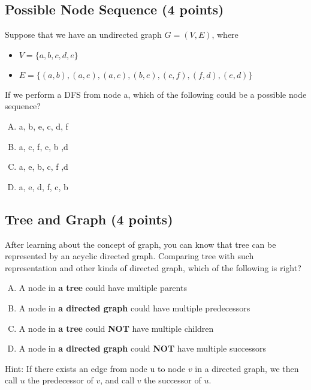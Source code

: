 \documentclass[11pt]{exam}
\begin{document}
\subsection{Possible Node Sequence (4 points)}
    Suppose that we have an undirected graph $G=(V,E)$, where
    \begin{itemize}
        \item $V=\{a,b,c,d,e\}$
        \item $E = \{(a, b), (a, e), (a, c), (b, e), (c, f), (f, d), (e, d)\}$
    \end{itemize}
    If we perform a DFS from node a, which of the following could be a possible node sequence?
    \begin{enumerate}[A.]
        \item a, b, e, c, d, f
        \item a, c, f, e, b ,d
        \item a, e, b, c, f ,d
        \item a, e, d, f, c, b
    \end{enumerate}
    \begin{solution}
    \end{solution}
\subsection{Tree and Graph (4 points)}
    After learning about the concept of graph, you can know that tree can be represented by an acyclic directed graph. Comparing tree with such representation and other kinds of directed graph, which of the following is right?
    \begin{enumerate}[A.]
        \item A node in \textbf{a tree} could have multiple parents
        \item A node in \textbf{a directed graph} could have multiple predecessors
        \item A node in \textbf{a tree} could \textbf{NOT} have multiple children
        \item A node in \textbf{a directed graph} could \textbf{NOT} have multiple successors
    \end{enumerate}
    Hint: If there exists an edge from node u to node $v$ in a directed graph, we then call $u$ the predecessor of $v$, and call $v$ the successor of $u$.
    \begin{solution}
    \end{solution}
\end{document}
